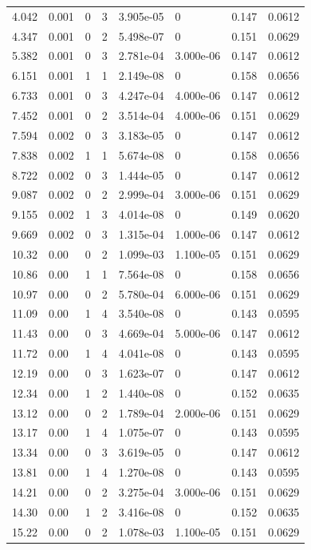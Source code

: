 \documentclass[preview]{standalone}
\begin{document}
{{\begin{tabular}{L{1.2cm}C{1.2cm} C{0.3cm}C{0.5cm} C{1.4cm}C{1.4cm} C{1.4cm}C{1.4cm}}
  4.042  &  0.001  & 0     &  3 &  3.905e-05  & 0  & 0.147 &  0.0612   \\ 
  4.347  &  0.001  & 0     &  2 &  5.498e-07  & 0  & 0.151 &  0.0629   \\ 
  5.382  &  0.001  & 0     &  3 &  2.781e-04  & 3.000e-06  & 0.147 &  0.0612   \\ 
  6.151  &  0.001  & 1     &  1 &  2.149e-08  & 0  & 0.158 &  0.0656   \\ 
  6.733  &  0.001  & 0     &  3 &  4.247e-04  & 4.000e-06  & 0.147 &  0.0612   \\ 
  7.452  &  0.001  & 0     &  2 &  3.514e-04  & 4.000e-06  & 0.151 &  0.0629   \\ 
  7.594  &  0.002  & 0     &  3 &  3.183e-05  & 0  & 0.147 &  0.0612   \\ 
  7.838  &  0.002  & 1     &  1 &  5.674e-08  & 0  & 0.158 &  0.0656   \\ 
  8.722  &  0.002  & 0     &  3 &  1.444e-05  & 0  & 0.147 &  0.0612   \\ 
  9.087  &  0.002  & 0     &  2 &  2.999e-04  & 3.000e-06  & 0.151 &  0.0629   \\ 
  9.155  &  0.002  & 1     &  3 &  4.014e-08  & 0  & 0.149 &  0.0620   \\ 
  9.669  &  0.002  & 0     &  3 &  1.315e-04  & 1.000e-06  & 0.147 &  0.0612   \\ 
  10.32  &  0.00  & 0     &  2 &  1.099e-03  & 1.100e-05  & 0.151 &  0.0629   \\ 
  10.86  &  0.00  & 1     &  1 &  7.564e-08  & 0  & 0.158 &  0.0656   \\ 
  10.97  &  0.00  & 0     &  2 &  5.780e-04  & 6.000e-06  & 0.151 &  0.0629   \\ 
  11.09  &  0.00  & 1     &  4 &  3.540e-08  & 0  & 0.143 &  0.0595   \\ 
  11.43  &  0.00  & 0     &  3 &  4.669e-04  & 5.000e-06  & 0.147 &  0.0612   \\ 
  11.72  &  0.00  & 1     &  4 &  4.041e-08  & 0  & 0.143 &  0.0595   \\ 
  12.19  &  0.00  & 0     &  3 &  1.623e-07  & 0  & 0.147 &  0.0612   \\ 
  12.34  &  0.00  & 1     &  2 &  1.440e-08  & 0  & 0.152 &  0.0635   \\ 
  13.12  &  0.00  & 0     &  2 &  1.789e-04  & 2.000e-06  & 0.151 &  0.0629   \\ 
  13.17  &  0.00  & 1     &  4 &  1.075e-07  & 0  & 0.143 &  0.0595   \\ 
  13.34  &  0.00  & 0     &  3 &  3.619e-05  & 0  & 0.147 &  0.0612   \\ 
  13.81  &  0.00  & 1     &  4 &  1.270e-08  & 0  & 0.143 &  0.0595   \\ 
  14.21  &  0.00  & 0     &  2 &  3.275e-04  & 3.000e-06  & 0.151 &  0.0629   \\ 
  14.30  &  0.00  & 1     &  2 &  3.416e-08  & 0  & 0.152 &  0.0635   \\ 
  15.22  &  0.00  & 0     &  2 &  1.078e-03  & 1.100e-05  & 0.151 &  0.0629   \\ 
\hline 
\end{tabular} 

}}
\end{document}
